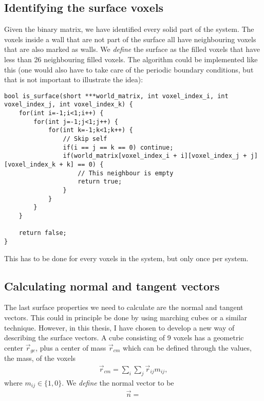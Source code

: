 \subsection{Identifying the surface voxels}
Given the binary matrix, we have identified every solid part of the system. The voxels inside a wall that are not part of the surface all have neighbouring voxels that are also marked as walls. We \textit{define} the surface as the filled voxels that have less than 26 neighbouring filled voxels. The algorithm could be implemented like this (one would also have to take care of the periodic boundary conditions, but that is not important to illustrate the idea):
\begin{lstlisting}
bool is_surface(short ***world_matrix, int voxel_index_i, int voxel_index_j, int voxel_index_k) {
	for(int i=-1;i<1;i++) {
    	for(int j=-1;j<1;j++) {
			for(int k=-1;k<1;k++) {
				// Skip self
				if(i == j == k == 0) continue; 
                if(world_matrix[voxel_index_i + i][voxel_index_j + j][voxel_index_k + k] == 0) {
                	// This neighbour is empty
                	return true;
                }
            }
        }
    }

    return false;
}
\end{lstlisting}
This has to be done for every voxels in the system, but only once per system.
\subsection{Calculating normal and tangent vectors}
The last surface properties we need to calculate are the normal and tangent vectors. This could in principle be done by using marching cubes \cite{article:marching_cubes_original} or a similar technique. However, in this thesis, I have chosen to develop a new way of describing the surface vectors. A cube consisting of 9 voxels has a geometric center $\vec r_{gc}$, plus a center of mass $\vec r_{cm}$ which can be defined through the values, the mass, of the voxels
\begin{align}
	\vec r_{cm} = \sum_i\sum_j \vec r_{ij}m_{ij},
\end{align}
where $m_{ij} \in \{1,0\}$. We \textit{define} the normal vector to be 
\begin{align}
	\vec n = 
\end{align}
